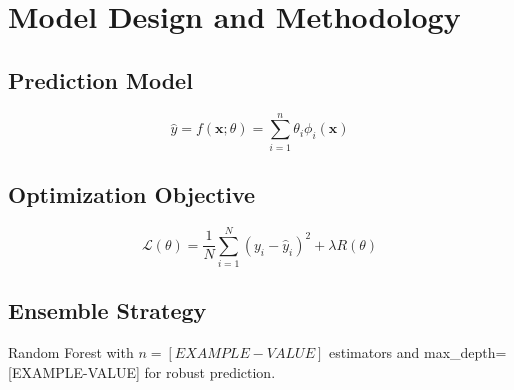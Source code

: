 \section{Model Design and Methodology}

\subsection{Prediction Model}
\[
\hat{y} = f(\mathbf{x}; \theta) = \sum_{i=1}^{n} \theta_i \phi_i(\mathbf{x})
\]

\subsection{Optimization Objective}
\[
\mathcal{L}(\theta) = \frac{1}{N} \sum_{i=1}^{N} (y_i - \hat{y}_i)^2 + \lambda R(\theta)
\]

\subsection{Ensemble Strategy}
Random Forest with $n = [EXAMPLE-VALUE]$ estimators and max\_depth=[EXAMPLE-VALUE] for robust prediction.
